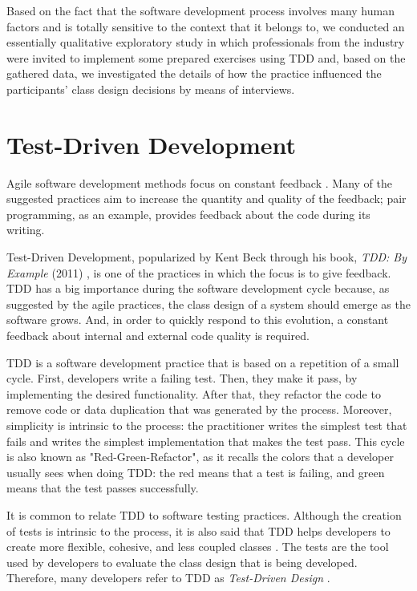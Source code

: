 \documentclass[times]{speauth}
\begin{document}
Based on the fact that the software development process involves many
human factors and is totally sensitive to the context that it belongs to,
we conducted an essentially qualitative exploratory study in which professionals
from the industry were invited to implement some prepared exercises using TDD and,
based on the gathered data, we investigated the details of how the practice influenced
the participants' class design decisions by means of interviews.

\section{Test-Driven Development}

Agile software development methods focus on constant feedback \cite{AgileManifesto}. 
Many of the suggested practices
aim to increase the quantity and quality of the feedback; pair programming,
as an example, provides feedback about the code during its writing.

Test-Driven Development, popularized by Kent Beck through his book, \textit{TDD: By Example} (2011)
\cite{TDDByExample}, is one of the practices in which the focus is to give feedback. TDD has
a big importance during the software development cycle because, as suggested by the agile
practices, the class design of a system should emerge as the software grows. And, in order
to quickly respond to this evolution, a constant feedback about internal and external code
quality is required.

TDD is a software development practice that is based on a repetition of a small
cycle. First, developers write a failing test. Then, they make it pass,
by implementing the desired functionality. After that, they refactor the code
to remove code or data duplication that was generated by the process. Moreover,
simplicity is intrinsic to the process: the practitioner writes the simplest
test that fails and writes the simplest implementation that makes the
test pass. This cycle is also known as "Red-Green-Refactor", as it recalls the
colors that a developer usually sees when doing TDD: the red means that a test
is failing, and green means that the test passes successfully.

It is common to relate TDD to software testing practices. Although the creation
of tests is intrinsic to the process, it is also said that TDD helps developers
to create more flexible, cohesive, and less coupled classes \cite{tdd-taxonomy}. 
The tests are the tool used by developers to evaluate the class design that is being developed.
Therefore, many developers refer to TDD 
as \textit{Test-Driven Design} \cite{tdd-taxonomy}.
\end{document}
